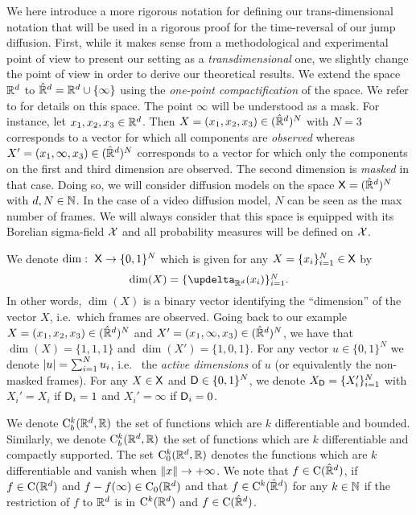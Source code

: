We here introduce a more rigorous notation for defining our trans-dimensional notation that will be used in a rigorous proof for the time-reversal of our jump diffusion. First, while it makes sense from a methodological and experimental point of
view to present our setting as a \emph{transdimensional} one, we slightly change
the point of view in order to derive our theoretical results. We extend the
space $\mathbb{R}^d$ to $\hat{\mathbb{R}}^d = \mathbb{R}^d \cup \{\infty\}$ using the
\emph{one-point compactification} of the space. We refer to
\cite{kelley2017general} for details on this space. The point $\infty$ will be
understood as a mask. For instance, let $x_1, x_2, x_3 \in \mathbb{R}^d$. Then
$X = (x_1, x_2, x_3) \in (\hat{\mathbb{R}}^d)^N$ with $N=3$ corresponds to a vector
for which all components are \emph{observed} whereas
$X' = (x_1, \infty, x_3) \in (\hat{\mathbb{R}}^d)^N$ corresponds to a vector for
which only the components on the first and third dimension are observed. The
second dimension is \emph{masked} in that case. Doing so, we will consider
diffusion models on the space $\mathsf{X} = (\hat{\mathbb{R}}^d)^N$ with $d, N \in
\mathbb{N}$. In the case of a video diffusion model, $N$ can be seen as the max number of frames. We
will always consider that this space is equipped with its Borelian sigma-field
$\mathcal{X}$ and all probability measures will be defined on $\mathcal{X}$.

We denote $\mathrm{dim}: \ \mathsf{X} \to \{0,1\}^N$ which is given for any $X = \{x_i\}_{i=1}^N \in \mathsf{X}$ by
\begin{equation}
  \textstyle \dim(X) = \{\updelta_{\rset^d}(x_i)\}_{i=1}^N . 
\end{equation}
In other words, $\dim(X)$ is a binary vector identifying the ``dimension'' of
the vector $X$, i.e.~which frames are observed. Going back to our example
$X = (x_1, x_2, x_3) \in (\hat{\mathbb{R}}^d)^N$ and
$X' = (x_1, \infty, x_3) \in (\hat{\mathbb{R}}^d)^N$, we have that
$\dim(X) = \{1,1,1\}$ and $\dim(X') = \{1, 0, 1\}$. For any vector
$u \in \{0,1\}^N$ we denote $|u| = \sum_{i=1}^N u_i$, i.e.~ the \emph{active
  dimensions} of $u$ (or equivalently the non-masked frames). For any
$X \in \mathsf{X}$ and $\mathsf{D} \in \{0, 1\}^N$, we denote $X_{\mathsf{D}} = \{X_i'\}_{i=1}^N$
with $X_i'=X_i$ if $\mathsf{D}_i=1$ and $X_i'=\infty$ if $\mathsf{D}_i=0$.

We denote $\mathrm{C}_b^k(\mathbb{R}^d, \mathbb{R})$ the set of functions which are $k$
differentiable and bounded. Similarly, we denote $\mathrm{C}_b^k(\mathbb{R}^d, \mathbb{R})$ the
set of functions which are $k$ differentiable and compactly supported. The set
$\mathrm{C}_0^k(\mathbb{R}^d, \mathbb{R})$ denotes the functions which are $k$ differentiable
and vanish when $\| x \| \to +\infty$.
We note that $f \in \mathrm{C}(\hat{\mathbb{R}}^d)$, if
$f \in \mathrm{C}(\mathbb{R}^d)$ and $f -f(\infty) \in \mathrm{C}_0(\mathbb{R}^d)$ and that
$f \in \mathrm{C}^k(\hat{\mathbb{R}}^d)$ for any $k \in \mathbb{N}$ if the restriction of $f$ to
$\mathbb{R}^d$ is in $\mathrm{C}^k(\mathbb{R}^d)$ and $f \in \mathrm{C}(\hat{\mathbb{R}}^d)$.

